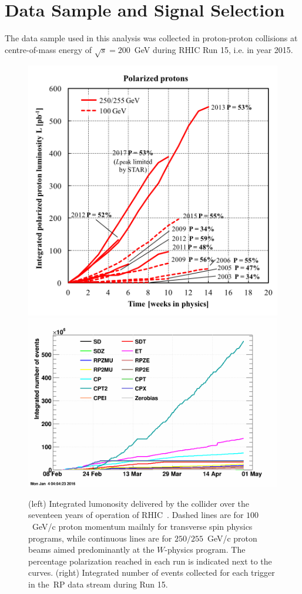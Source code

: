 \chapter{Data Sample and Signal Selection}\label{section:star_data_sample}\label{section:star_trigger_selection}
The data sample used in this analysis was collected in proton-proton collisions at centre-of-mass energy of $\sqrt{s}=200$~GeV during RHIC Run 15, i.e. in year 2015. %

\begin{figure}[h!]
	\centering
	\includegraphics[width=.39\textwidth]{chapters/dataSampleSTAR/img/RhicLuminosityPP.png}
	\hfill
	\includegraphics[width=.6\textwidth]{chapters/dataSampleSTAR/img/nEvents.png}
	\caption{(left) Integrated lumonosity delivered by the collider over the seventeen years of operation of RHIC~\cite{RHIC:rhicRunLuminosity}. Dashed lines are for $100$~GeV/c proton momentum mailnly for transverse spin physics programs, while continuous lines are for $250/255$~GeV/c proton beams aimed predominantly at the $W$-physics program. The percentage polarization reached in each run is indicated next to the curves. (right) Integrated number of events collected for each trigger in the~\ac{RP} data stream during Run 15. }
	\label{fig:lumiRHIC}
\end{figure}

